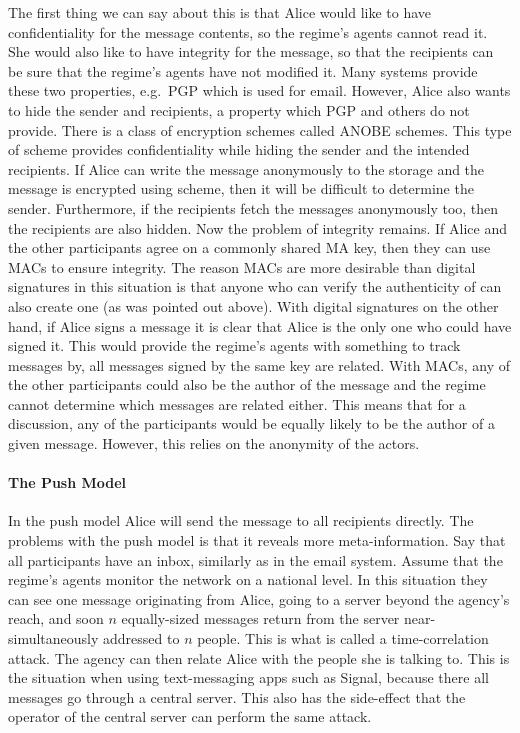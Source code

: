 The first thing we can say about this is that Alice would like to have 
confidentiality for the message contents, so the regime's agents cannot read 
it.
She would also like to have integrity for the message, so that the recipients 
can be sure that the regime's agents have not modified it.
Many systems provide these two properties, e.g.\ \ac{PGP} which is used for 
email.
However, Alice also wants to hide the sender and recipients, a property which 
\ac{PGP} and others do not provide.
There is a class of encryption schemes called \ac{ANOBE} schemes.
This type of scheme provides confidentiality while hiding the sender and the 
intended recipients.
If Alice can write the message anonymously to the storage and the message is 
encrypted using  scheme, then it will be difficult to determine the 
sender.
Furthermore, if the recipients fetch the messages anonymously too, then the 
recipients are also hidden.
Now the problem of integrity remains.
If Alice and the other participants agree on a commonly shared \ac{MA} key, 
then they can use \acp{MAC} to ensure integrity. %
The reason \acp{MAC} are more desirable than digital signatures in this 
situation is that anyone who can verify the authenticity of  can also 
create one (as was pointed out above).
With digital signatures on the other hand, if Alice signs a message it is clear 
that Alice is the only one who could have signed it.
This would provide the regime's agents with something to track messages by, all 
messages signed by the same key are related.
With \acp{MAC}, any of the other participants could also be the author of the 
message and the regime cannot determine which messages are related either.
This means that for a discussion, any of the participants would be equally 
likely to be the author of a given message.
However, this relies on the anonymity of the actors.

\paragraph{The Push Model}

In the push model Alice will send the message to all recipients directly.
The problems with the push model is that it reveals more meta-information.
Say that all participants have an inbox, similarly as in the email system.
Assume that the regime's agents monitor the network on a national level.
In this situation they can see one message originating from Alice, going to 
a server beyond the agency's reach, and soon \(n\) equally-sized messages 
return from the server near-simultaneously addressed to \(n\) people.
This is what is called a time-correlation attack.
The agency can then relate Alice with the people she is talking to.
This is the situation when using text-messaging apps such as Signal, because 
there all messages go through a central server.
This also has the side-effect that the operator of the central server can 
perform the same attack.

